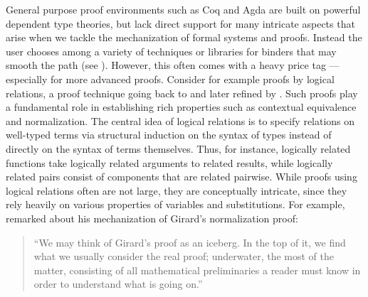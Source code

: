 General purpose proof environments such as Coq
\citep{bertot/casteran:2004} and Agda \citep{Norell:phd07} are built on
powerful dependent type theories, but lack direct support for many
intricate aspects that arise when we tackle the mechanization of
formal systems and proofs. Instead the user chooses among a variety of
techniques or libraries for binders that may smooth the path (see
\cite{Aydemir:TechReport09}). However, this often comes with a heavy price tag ---
  especially for more advanced proofs.  Consider for example proofs by
  logical relations, a proof technique going back to \cite{Tait67} and
  later refined by \cite{GirardLafontTaylor:proofsAndTypes}.  Such
  proofs play a fundamental role in establishing rich properties such as
  contextual equivalence and normalization.  The central idea of
  logical relations is to specify relations on well-typed terms via
  structural induction on the syntax of types instead of directly on
  the syntax of terms themselves. Thus, for instance, logically
  related functions take logically related arguments to related
  results, while logically related pairs consist of components that
  are related pairwise.  While proofs using logical relations often
  are not large, they are conceptually intricate, since they rely
  heavily on various properties of variables and substitutions.
%
%
For example,  \cite{Berardi:WLF90} remarked about his mechanization of Girard's normalization proof:
\begin{quote}
``We may think of Girard's proof as an iceberg. In the top of it, we find what we usually consider the real proof; underwater, the most  of the matter, consisting of all mathematical preliminaries a reader must know in order to understand what is going on.''
\end{quote}


